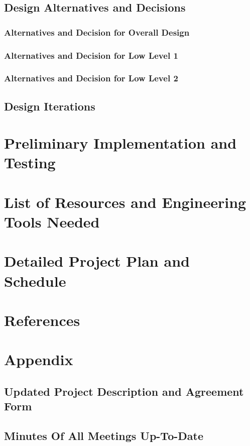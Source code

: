 \documentclass[12pt]{article}
\begin{document}
\subsection{Design Alternatives and Decisions}
\subsubsection{Alternatives and Decision for Overall Design}
\subsubsection{Alternatives and Decision for Low Level 1}
\subsubsection{Alternatives and Decision for Low Level 2}
\subsection{Design Iterations}
\section{Preliminary Implementation and Testing}
\section{List of Resources and Engineering Tools Needed}
\section{Detailed Project Plan and Schedule}
\section{References}
\section{Appendix}
\subsection{Updated Project Description and Agreement Form}
\subsection{Minutes Of All Meetings Up-To-Date}
\end{document}
